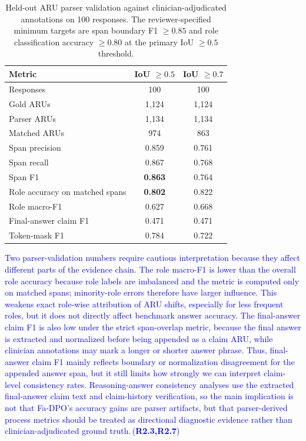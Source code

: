 \documentclass[a4paper,fleqn,doubleblind]{cas-sc}
\DeclareRobustCommand{\added}[1]{\textcolor{blue}{#1}}
\DeclareRobustCommand{\revtag}[1]{\textcolor{blue}{\scriptsize\,(\textbf{#1})}}
\begin{document}
\begin{table}[htbp]
    \centering
    \begingroup\color{blue}
    \footnotesize
    \caption{Held-out ARU parser validation against clinician-adjudicated annotations on 100 responses. The reviewer-specified minimum targets are span boundary F1 $\geq 0.85$ and role classification accuracy $\geq 0.80$ at the primary IoU $\geq 0.5$ threshold.}
    \label{tab:aru_parser_validation}
    \begin{tabular}{lcc}
        \toprule
        \textbf{Metric} & \textbf{IoU $\geq 0.5$} & \textbf{IoU $\geq 0.7$} \\
        \midrule
        Responses & 100 & 100 \\
        Gold ARUs & 1,124 & 1,124 \\
        Parser ARUs & 1,134 & 1,134 \\
        Matched ARUs & 974 & 863 \\
        Span precision & 0.859 & 0.761 \\
        Span recall & 0.867 & 0.768 \\
        Span F1 & \textbf{0.863} & 0.764 \\
        Role accuracy on matched spans & \textbf{0.802} & 0.822 \\
        Role macro-F1 & 0.627 & 0.668 \\
        Final-answer claim F1 & 0.471 & 0.471 \\
        Token-mask F1 & 0.784 & 0.722 \\
        \bottomrule
    \end{tabular}
    \endgroup
\end{table}

\added{Two parser-validation numbers require cautious interpretation because they affect different parts of the evidence chain. The role macro-F1 is lower than the overall role accuracy because role labels are imbalanced and the metric is computed only on matched spans; minority-role errors therefore have larger influence. This weakens exact role-wise attribution of ARU shifts, especially for less frequent roles, but it does not directly affect benchmark answer accuracy. The final-answer claim F1 is also low under the strict span-overlap metric, because the final answer is extracted and normalized before being appended as a claim ARU, while clinician annotations may mark a longer or shorter answer phrase. Thus, final-answer claim F1 mainly reflects boundary or normalization disagreement for the appended answer span, but it still limits how strongly we can interpret claim-level consistency rates. Reasoning-answer consistency analyses use the extracted final-answer claim text and claim-history verification, so the main implication is not that Fa-DPO's accuracy gains are parser artifacts, but that parser-derived process metrics should be treated as directional diagnostic evidence rather than clinician-adjudicated ground truth.}\revtag{R2.3,R2.7}
\end{document}
